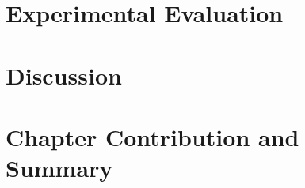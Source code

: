 \documentclass[10pt,letterpaper,twoside,openright]{book}
\begin{document}
\newpage

\section{Experimental Evaluation}

\newpage

\section{Discussion}

\newpage

\section{Chapter Contribution and Summary}

\newpage










\end{document}
